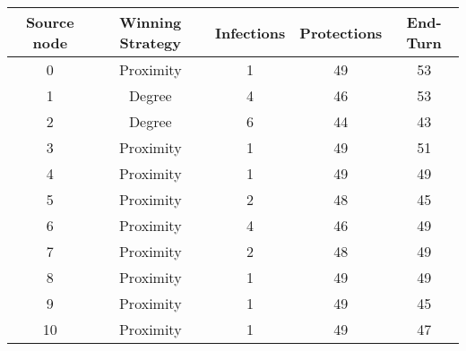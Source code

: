 \documentclass[results.tex]{subfiles}
\begin{document}
    \begin{center}
        \begin{tabular}{| c || c | c | c | c |}
            \hline
            {\bfseries Source node} & {\bfseries Winning Strategy} & {\bfseries Infections} & {\bfseries Protections}
            & {\bfseries End-Turn}
            \\  %
            \hline\hline
            0                       & Proximity                    & 1                      & 49                      & 53                   \\
            \hline
            1                       & Degree                       & 4                      & 46                      & 53                   \\
            \hline
            2                       & Degree                       & 6                      & 44                      & 43                   \\
            \hline
            3                       & Proximity                    & 1                      & 49                      & 51                   \\
            \hline
            4                       & Proximity                    & 1                      & 49                      & 49                   \\
            \hline
            5                       & Proximity                    & 2                      & 48                      & 45                   \\
            \hline
            6                       & Proximity                    & 4                      & 46                      & 49                   \\
            \hline
            7                       & Proximity                    & 2                      & 48                      & 49                   \\
            \hline
            8                       & Proximity                    & 1                      & 49                      & 49                   \\
            \hline
            9                       & Proximity                    & 1                      & 49                      & 45                   \\
            \hline
            10                      & Proximity                    & 1                      & 49                      & 47                   \\

\end{tabular}
\end{center}
\end{document}

